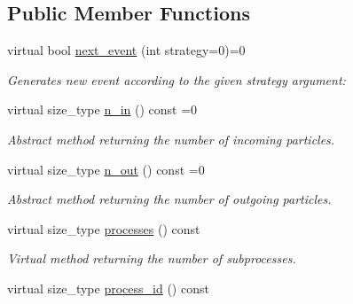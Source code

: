 \subsection*{Public Member Functions}
\begin{DoxyCompactItemize}
\item 
\hypertarget{a00451_adeb74015a97b7489f511c39eaaf6c00b}{}virtual bool \hyperlink{a00451_adeb74015a97b7489f511c39eaaf6c00b}{next\+\_\+event} (int strategy=0)=0\label{a00451_adeb74015a97b7489f511c39eaaf6c00b}

\begin{DoxyCompactList}\small\item\em Generates new event according to the given strategy argument\+: \end{DoxyCompactList}\item 
\hypertarget{a00451_a8f890e649f7ac1165f881ce33673b34e}{}virtual size\+\_\+type \hyperlink{a00451_a8f890e649f7ac1165f881ce33673b34e}{n\+\_\+in} () const =0\label{a00451_a8f890e649f7ac1165f881ce33673b34e}

\begin{DoxyCompactList}\small\item\em Abstract method returning the number of incoming particles. \end{DoxyCompactList}\item 
\hypertarget{a00451_a8dfbca7dcaea0433c1edebdd8e41b8a2}{}virtual size\+\_\+type \hyperlink{a00451_a8dfbca7dcaea0433c1edebdd8e41b8a2}{n\+\_\+out} () const =0\label{a00451_a8dfbca7dcaea0433c1edebdd8e41b8a2}

\begin{DoxyCompactList}\small\item\em Abstract method returning the number of outgoing particles. \end{DoxyCompactList}\item 
\hypertarget{a00451_ac165d06105c65340f233bd5eca2b36f0}{}virtual size\+\_\+type \hyperlink{a00451_ac165d06105c65340f233bd5eca2b36f0}{processes} () const \label{a00451_ac165d06105c65340f233bd5eca2b36f0}

\begin{DoxyCompactList}\small\item\em Virtual method returning the number of subprocesses. \end{DoxyCompactList}\item 
\hypertarget{a00451_adfb405d7843911aeb99a03379c7ec66b}{}virtual size\+\_\+type \hyperlink{a00451_adfb405d7843911aeb99a03379c7ec66b}{process\+\_\+id} () const \label{a00451_adfb405d7843911aeb99a03379c7ec66b}


\end{DoxyCompactItemize}
